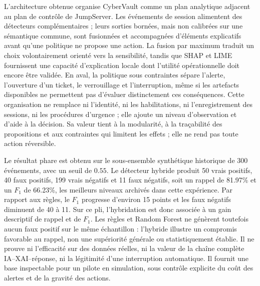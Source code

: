 \documentclass[11pt,a4paper,oneside]{report}
\theoremstyle{definition}
\theoremstyle{plain}
\begin{document}
L'architecture obtenue organise CyberVault comme un plan analytique adjacent au plan de contrôle de JumpServer. Les événements de session alimentent des détecteurs complémentaires ; leurs sorties bornées, mais non calibrées sur une sémantique commune, sont fusionnées et accompagnées d'éléments explicatifs avant qu'une politique ne propose une action. La fusion par maximum traduit un choix volontairement orienté vers la sensibilité, tandis que SHAP et LIME fournissent une capacité d'explication locale dont l'utilité opérationnelle doit encore être validée. En aval, la politique sous contraintes sépare l'alerte, l'ouverture d'un ticket, le verrouillage et l'interruption, même si les artefacts disponibles ne permettent pas d'évaluer distinctement ces conséquences. Cette organisation ne remplace ni l'identité, ni les habilitations, ni l'enregistrement des sessions, ni les procédures d'urgence ; elle ajoute un niveau d'observation et d'aide à la décision. Sa valeur tient à la modularité, à la traçabilité des propositions et aux contraintes qui limitent les effets ; elle ne rend pas toute action réversible.

Le résultat phare est obtenu sur le sous-ensemble synthétique historique de 300 événements, avec un seuil de \(0.55\). Le détecteur hybride produit 50 vrais positifs, 40 faux positifs, 199 vrais négatifs et 11 faux négatifs, soit un rappel de 81.97\% et un \(F_1\) de 66.23\%, les meilleurs niveaux archivés dans cette expérience. Par rapport aux règles, le \(F_1\) progresse d'environ 15 points et les faux négatifs diminuent de 40 à 11. Sur ce pli, l'hybridation est donc associée à un gain descriptif de rappel et de \(F_1\). Les règles et Random Forest ne génèrent toutefois aucun faux positif sur le même échantillon : l'hybride illustre un compromis favorable au rappel, non une supériorité générale ou statistiquement établie. Il ne prouve ni l'efficacité sur des données réelles, ni la valeur de la chaîne complète IA--XAI--réponse, ni la légitimité d'une interruption automatique. Il fournit une base inspectable pour un pilote en simulation, sous contrôle explicite du coût des alertes et de la gravité des actions.
\end{document}
